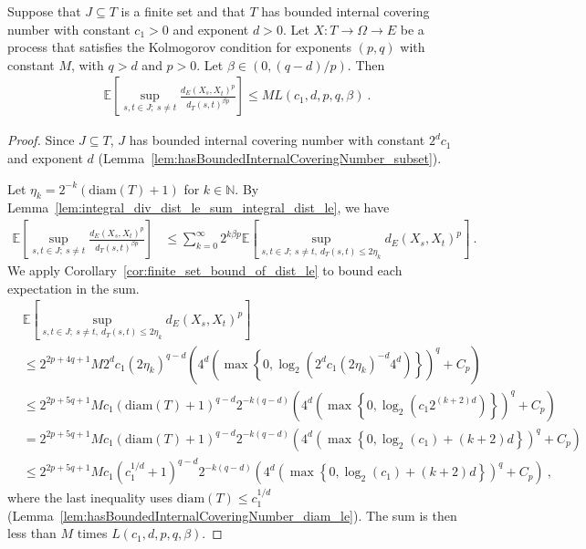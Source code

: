 \begin{lemma}\label{lem:finite_set_bound}
  \leanok
Suppose that $J \subseteq T$ is a finite set and that $T$ has bounded internal covering number with constant $c_1>0$ and exponent $d > 0$.
Let $X : T \to \Omega \to E$ be a process that satisfies the Kolmogorov condition for exponents $(p,q)$ with constant $M$, with $q > d$ and $p > 0$.
Let $\beta \in(0, (q - d)/p)$.
Then
\begin{align*}
  \mathbb{E}\left[ \sup_{s, t \in J;\: s \ne t} \frac{d_E(X_s, X_t)^p}{d_T(s, t)^{\beta p}} \right]
  \le M L(c_1, d, p, q, \beta)
  \: .
\end{align*}
\end{lemma}

\begin{proof}
  \leanok

Since $J \subseteq T$, $J$ has bounded internal covering number with constant $2^d c_1$ and exponent $d$ (Lemma~\ref{lem:hasBoundedInternalCoveringNumber_subset}).

Let $\eta_k = 2^{-k}(\mathrm{diam}(T) + 1)$ for $k \in \mathbb{N}$.
By Lemma~\ref{lem:integral_div_dist_le_sum_integral_dist_le}, we have
\begin{align*}
  \mathbb{E}\left[ \sup_{s, t \in J;\: s \ne t} \frac{d_E(X_s, X_t)^p}{d_T(s, t)^{\beta p}} \right]
  &\le \sum_{k=0}^\infty 2^{k \beta p} \mathbb{E}\left[ \sup_{s, t \in J;\: s \ne t, \: d_T(s, t) \le 2 \eta_k} d_E(X_s, X_t)^p \right]
  \: .
\end{align*}
We apply Corollary~\ref{cor:finite_set_bound_of_dist_le} to bound each expectation in the sum.
\begin{align*}
  &\mathbb{E}\left[ \sup_{s, t \in J;\: s \ne t, \: d_T(s, t) \le 2 \eta_k} d_E(X_s, X_t)^p \right]
  \\
  &\le 2^{2p+4q+1} M 2^d c_1 (2 \eta_k)^{q-d} \left(4^d \left(\max\left\{0, \log_2 \left(2^d c_1 (2 \eta_k)^{-d} 4^d \right) \right\} \right)^q
    + C_p\right)
  \\
  &\le 2^{2p+5q+1} M c_1 (\mathrm{diam}(T)+1)^{q-d} 2^{-k(q-d)} \left(4^d \left(\max\left\{0, \log_2 \left(c_1 2^{(k + 2)d} \right) \right\} \right)^q
    + C_p\right)
  \\
  &= 2^{2p+5q+1} M c_1 (\mathrm{diam}(T)+1)^{q-d} 2^{-k(q-d)} \left(4^d \left(\max\left\{0, \log_2(c_1) + (k + 2)d \right\} \right)^q
    + C_p\right)
  \\
  &\le 2^{2p+5q+1} M c_1 (c_1^{1/d}+1)^{q-d} 2^{-k(q-d)} \left(4^d \left(\max\left\{0, \log_2(c_1) + (k + 2)d \right\} \right)^q
    + C_p\right)
  \: ,
\end{align*}
where the last inequality uses $\mathrm{diam}(T) \le c_1^{1/d}$ (Lemma~\ref{lem:hasBoundedInternalCoveringNumber_diam_le}).
The sum is then less than $M$ times $L(c_1, d, p, q, \beta)$.
\end{proof}


